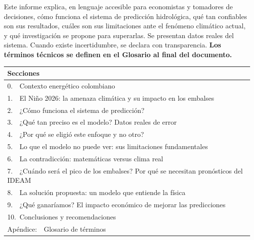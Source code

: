 \documentclass[11pt,a4paper]{article}
\begin{document}
\vspace{4mm}

\begin{infobox}
Este informe explica, en lenguaje accesible para economistas y tomadores de decisiones, cómo funciona el sistema de predicción hidrológica, qué tan confiables son sus resultados, cuáles son sus limitaciones ante el fenómeno climático actual, y qué investigación se propone para superarlas. Se presentan datos reales del sistema. Cuando existe incertidumbre, se declara con transparencia. \textbf{Los términos técnicos se definen en el Glosario al final del documento.}
\end{infobox}

\vspace{5mm}


\vspace{3mm}

\begin{small}
\begin{tabular}{@{}p{}@{}}
\toprule
\textbf{Secciones} \\
\midrule
0.\ \ Contexto energético colombiano \\
1.\ \ El Niño 2026: la amenaza climática y su impacto en los embalses \\
2.\ \ ¿Cómo funciona el sistema de predicción? \\
3.\ \ ¿Qué tan preciso es el modelo? Datos reales de error \\
4.\ \ ¿Por qué se eligió este enfoque y no otro? \\
5.\ \ Lo que el modelo no puede ver: sus limitaciones fundamentales \\
6.\ \ La contradicción: matemáticas versus clima real \\
7.\ \ ¿Cuándo será el pico de los embalses? Por qué se necesitan pronósticos del IDEAM \\
8.\ \ La solución propuesta: un modelo que entiende la física \\
9.\ \ ¿Qué ganaríamos? El impacto económico de mejorar las predicciones \\
10.\ Conclusiones y recomendaciones \\
Apéndice:\ \ Glosario de términos \\
\bottomrule
\end{tabular}
\end{small}

\newpage
\end{document}
